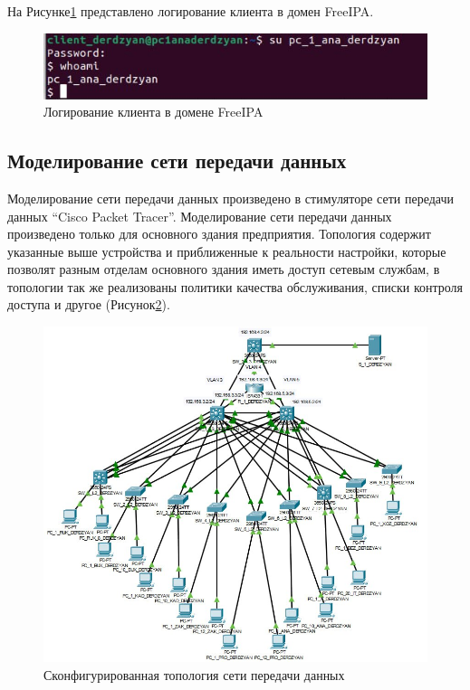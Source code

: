На Рисунке\;\ref{fig:IPA_user_log} представлено логирование клиента в домен FreeIPA.

\begin{figure}[H]
\centering
\includegraphics[scale=0.7]{../misc/IPA_user_log.jpg}
\caption{Логирование клиента в домене FreeIPA\label{fig:IPA_user_log}}
\end{figure}



\subsection{Моделирование сети передачи данных}


Моделирование сети передачи данных произведено в стимуляторе сети передачи данных ``Cisco Packet Tracer''. Моделирование сети передачи данных произведено только для основного здания предприятия. Топология содержит указанные выше устройства и приближенные к реальности настройки, которые позволят разным отделам основного здания иметь доступ сетевым службам, в топологии так же реализованы политики качества обслуживания, списки контроля доступа и другое (Рисунок\;\ref{fig:cisco_topo}).

\begin{figure}[H]
\centering
\includegraphics[scale=0.45]{../misc/cisco_topo.png}
\caption{Сконфигурированная топология сети передачи данных\label{fig:cisco_topo}}
\end{figure}

